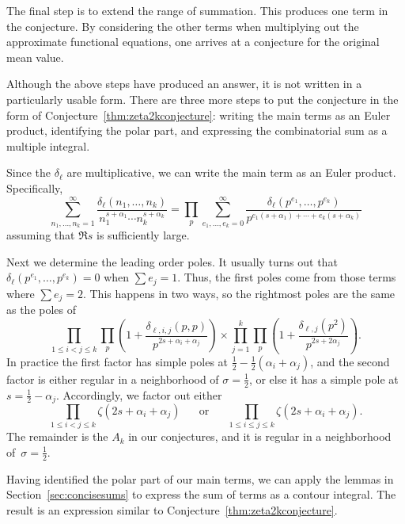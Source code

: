 \documentclass[12pt,letterpaper]{amsart}
\theoremstyle{plain}
\theoremstyle{definition}
\theoremstyle{remark}
\numberwithin{equation}{subsection}
\numberwithin{theorem}{subsection}
\numberwithin{table}{subsection}
\def\({\left(}
\def\){\right)}
\begin{document}
The final step is to extend the range of summation.  This produces one 
term in the conjecture.  By considering the other terms when
multiplying out the approximate functional equations, one arrives
at a conjecture for the original mean value.

Although the above steps have produced an answer, it is not
written in a particularly usable form.  There are three more steps
to put the conjecture in the form of Conjecture~\ref{thm:zeta2kconjecture}:
writing the main terms as an Euler product, identifying the polar part,
and expressing the combinatorial sum as a multiple integral.

Since the  $\delta_\ell$  are multiplicative, we can write the
main term as an
Euler product. Specifically,
\begin{equation}
\sum_{n_1,\dots ,n_k=1}^\infty
\frac {\delta_\ell(n_1,\dots,n_k)}{n_1^{s+\alpha_1} \cdots
n_k^{s+\alpha_k}} =\prod_p \sum_{e_1,\dots ,e_k=0}^\infty
\frac{\delta_\ell(p^{e_1},\dots,p^{e_k})}{p^{e_1(s+\alpha_1)+\cdots
+e_k(s +\alpha_k)}}
\end{equation}
assuming that $\Re s$ is sufficiently large. 

Next we determine the leading order poles.  It usually turns out
that 
$\delta_\ell(p^{e_1},\dots,p^{e_k})=0$ when 
$\sum e_j=1$. Thus, the first poles come from those terms
where $\sum e_j=2$.  This happens in two ways, so the rightmost poles
are the same as the poles of
\begin{equation}
\prod_{1\le i<j\le k} \prod_p 
\(1+\frac{\delta_{\ell,i,j}(p,p)}{p^{2s+\alpha_i+\alpha_j}} \)
\times
\prod_{j=1}^k \prod_p \(1+\frac{\delta_{\ell,j}(p^2)}{p^{2s+2\alpha_j}}\)
.
\end{equation}
In practice the first factor has simple poles at 
$\frac12-\frac12(\alpha_i+\alpha_j)$,
and the second factor is either regular in a neighborhood of $\sigma=\frac12$,
or else it has a simple pole at $s=\frac12-\alpha_j$.  
Accordingly, we factor out either
\begin{equation}
\prod_{1\le i<j\le k} \zeta(2s+\alpha_i+\alpha_j)
\ \ \ \ \ \ \text{ or }
\ \ \ \ \ \ 
\prod_{1\le i\le j\le k} \zeta(2s+\alpha_i+\alpha_j)
.
\end{equation}
The remainder is the $A_k$ in our conjectures, and it is 
regular in a neighborhood of~$\sigma=\frac12$.

Having identified the polar part of our main terms, we can apply the lemmas
in Section~\ref{sec:concisesums} to express the sum of terms
as a contour integral.  The result is an expression similar
to Conjecture~\ref{thm:zeta2kconjecture}.
\end{document}

